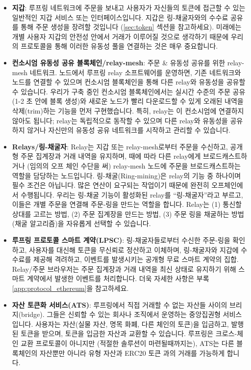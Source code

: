 \documentclass[UTF8,nofonts]{article}
\begin{document}
\begin{multicols}{2}
\begin{itemize}

\item \textbf{지갑}: 루프링 네트워크에 주문을 보내고 사용자가 자신들의 토큰에 접근할 수 있는 일반적인 지갑 서비스 또는 인터페이스입니다. 지갑은 링-채굴자와의 수수료 공유를 통해 주문 생성을 장려할 것입니다 (\ref{sec:token} 섹션을 참고하세요). 미래에는 개별 사용자 지갑의 안전성 안에서 거래가 이루어질 것으로 생각하기 때문에 우리의 프로토콜을 통해 이러한 유동성 풀을 연결하는 것은 매우 중요합니다.    

\item \textbf{컨소시엄 유동성 공유 블록체인/relay-mesh}: 주문 \& 유동성 공유를 위한 relay-mesh 네트워크. 노드에서 루프링 relay 소프트웨어를 운영하면, 기존 네트워크와 노드를 연결할 수 있으며 컨소시엄 블록체인을 통해 다른 relay와 유동성을 공유할 수 있습니다. 우리가 구축 중인 컨소시엄 블록체인에서는 실시간 수준의 주문 공유(1-2 초 안에 블록 생성)와 새로운 노드가 빨리 다운로드할 수 있게 오래된 내역을 삭제(trim)하는 기능을 먼저 구현했습니다. 특히, relay는 이 컨소시엄에 연결하지 않아도 됩니다; relay는 독립적으로 동작할 수 있으며 다른 relay와 유동성을 공유하지 않거나 자신만의 유동성 공유 네트워크를 시작하고 관리할 수 있습니다. 

\item \textbf{Relays/링-채굴자}: Relay는 지갑 또는 relay-mesh로부터 주문을 수신하고, 공개형 주문 집계장과 거래 내역을 유지하며, 때에 따라 다른 relay에게 브로드캐스트하거나 (임의의 오프 체인 수단을 써) relay-mesh 노드에 주문을 브로드캐스트하는 역할을 담당하는 노드입니다. 링-채굴(Ring-mining)은 relay의 기능 중 하나이며 필수 조건은 아닙니다. 많은 연산이 요구되는 작업이기 때문에 완전히 오프체인에서 수행됩니다. 우리는 링-채굴 기능이 활성화된 relay를 \enquote{링-채굴자}라고 부르고, 이들은 개별 주문을 연결해 주문-링을 만드는 역할을 합니다. Relay는 (1) 통신할 상대를 고르는 방법, (2) 주문 집계장을 만드는 방법, (3) 주문 링을 채굴하는 방법(채굴 알고리즘)을 자유롭게 선택할 수 있습니다.      

\item \textbf{루프링 프로토콜 스마트 계약(LPSC)}: 링-채굴자들로부터 수신한 주문-링을 확인하고, 사용자를 대신해 토큰을 무신뢰로 정산하고 이체하며, 링-채굴자와 지갑에 수수료를 제공해 격려하고, 이벤트를 발생시키는 공개형 무료 스마트 계약의 집합. Relay/주문 브라우저는 주문 집계장과 거래 내역을 최신 상태로 유지하기 위해 스마트 계약에서 발생한 이벤트를 처리합니다. 더욱 자세한 사항은 부록 \ref{app:protocol_ethereum}을 참고하세요.

\item \textbf{자산 토큰화 서비스(ATS)}: 루프링에서 직접 거래할 수 없는 자산들 사이의 브리지(bridge). 그들은 신뢰할 수 있는 회사나 조직에서 운영하는 중앙집권형 서비스입니다. 사용자는 자산(실물 자산, 명목 화폐, 다른 체인의 토큰)을 입금하고, 발행된 토큰을 받으며, 토큰을 입금한 자산과 교환할 수 있습니다. 루프링은 크로스-체인 교환 프로토콜이 아니지만 (적절한 솔루션이 마련될때까지는), ATS는 다른 블록체인의 자산뿐만 아니라 유형 자산과 ERC20 토큰 \cite{ERC20}과의 거래를 가능하게 합니다.


\end{itemize}
\end{multicols}
\end{document}
